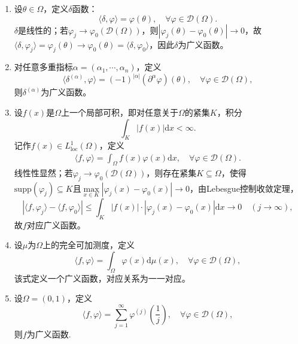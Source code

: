 \documentclass[../../main.tex]{subfiles}%
\begin{document}
\begin{examples}
\begin{enumerate}[(1)]
\item 设$\theta\in\Omega$，定义$\delta$函数：
$$\langle\delta,\varphi\rangle=\varphi(\theta),\quad\forall\varphi\in\mathscr{D}(\Omega).$$
$\delta$是线性的；若$\varphi_j\to\varphi_0(\mathscr{D}(\Omega))$，则$|\varphi_j(\theta)-\varphi_0(\theta)|\to0$，故$\langle\delta,\varphi_j\rangle=\varphi_j(\theta)\to\varphi_0(\theta)=\langle\delta,\varphi_0\rangle$，因此$\delta$为广义函数。

\item 对任意多重指标$\alpha=(\alpha_1,\cdots,\alpha_n)$，定义
$$\langle\delta^{(\alpha)},\varphi\rangle=(-1)^{|\alpha|}(\partial^\alpha\varphi)(\theta),\quad\forall\varphi\in\mathscr{D}(\Omega),$$
则$\delta^{(\alpha)}$为广义函数。

\item 设$f(x)$是$\Omega$上一个局部可积，即对任意关于$\Omega$的紧集$K$，积分
$$
\int_K|f(x)|\mathrm{d}x<\infty.
$$
记作$f(x)\in L^1_{\mathrm{loc}}(\Omega)$，定义
\begin{align}
\langle f,\varphi\rangle=\int_{\Omega}f(x)\varphi(x)\mathrm{d}x,\quad\forall\varphi\in\mathscr{D}(\Omega).\label{eq:loc_func_to_dist}
\end{align}
线性性显然；若$\varphi_j\to\varphi_0(\mathscr{D}(\Omega))$，则存在紧集$K\subseteq\Omega$，使得$\mathrm{supp}(\varphi_j)\subseteq K$且$\max\limits_{x\in K}|\varphi_j(x)-\varphi_0(x)|\to0$，由Lebesgue控制收敛定理，
$$|\langle f,\varphi_j\rangle-\langle f,\varphi_0\rangle|\leqslant\int_K|f(x)|\cdot|\varphi_j(x)-\varphi_0(x)|\mathrm{d}x\to0\quad(j\to\infty),$$
故$f$对应广义函数。

\item 设$\mu$为$\Omega$上的完全可加测度，定义
$$\langle f,\varphi\rangle=\int_{\Omega}\varphi(x)\mathrm{d}\mu(x),\quad\forall\varphi\in\mathscr{D}(\Omega),$$
该式定义一个广义函数，对应关系为一一对应。

\item 设$\Omega=(0,1)$，定义
$$\langle f,\varphi\rangle=\sum\limits_{j=1}^\infty\varphi^{(j)}\left(\frac{1}{j}\right),\quad\forall\varphi\in\mathscr{D}(\Omega),$$
则$f$为广义函数.
\end{enumerate}
\end{examples}
\end{document}
